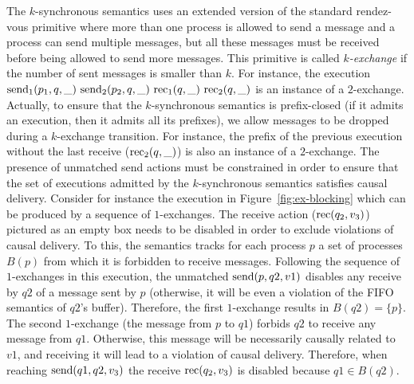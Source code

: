 The $k$-synchronous semantics uses an extended version of the standard rendez-vous primitive where more than one process is allowed to send a message and a process can send multiple messages, but all these messages must be received before being allowed to send more messages. This primitive is called \emph{$k$-exchange} if the number of sent messages is smaller than $k$. For instance, the execution 
$
\send{1}{p_1,q,\_}\ 
\send{2}{p_2,q,\_}\ 
\rec{1}{q,\_}\ 
\rec{2}{q,\_} 
$
is an instance of a $2$-exchange. 
Actually, to ensure that the $k$-synchronous semantics is prefix-closed (if it admits an execution, then it admits all its prefixes), we allow messages to be dropped during a $k$-exchange transition. 
For instance, the prefix of the previous execution without the last receive ($\mathrm{rec}_{2}({q,\_})$) is also an instance of a $2$-exchange. The presence of unmatched send actions must be constrained in order to ensure that the set of executions admitted by the $k$-synchronous semantics satisfies causal delivery. Consider for instance the execution in Figure~\ref{fig:ex-blocking} which can be produced by a sequence of $1$-exchanges. The receive action ($\mathrm{rec}({q_2,v_3})$) pictured as an empty box needs to be disabled in order to exclude violations of causal delivery. To this, the semantics tracks for each process $p$ a set of processes $B(p)$ from which it is forbidden to receive messages. Following the sequence of $1$-exchanges in this execution, the unmatched $\mathrm{send}({p,q2,v1})$ disables any receive by $q2$ of a message sent by $p$ (otherwise, it will be even a violation of the FIFO semantics of $q2$'s buffer). Therefore, the first $1$-exchange results in $B(q2)=\{p\}$. The second $1$-exchange (the message from $p$ to $q1$) forbids $q2$ to receive any message from $q1$. Otherwise, this message will be necessarily causally related to $v1$, and receiving it will lead to a violation of causal delivery. Therefore, when reaching $\mathrm{send}({q1,q2,v_3})$ the receive $\mathrm{rec}({q_2,v_3})$ is disabled because $q1\in B(q2)$.


